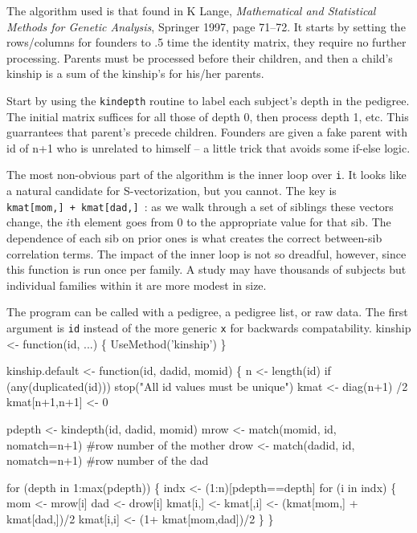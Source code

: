 \documentclass{article}
\begin{document}
The algorithm used is that found in K Lange, 
\emph{Mathematical and Statistical  Methods for Genetic Analysis}, 
Springer 1997, page 71--72.
It starts by setting the rows/columns for founders to .5 time the identity
matrix, they require no further processing.  
Parents must be processed before their children, and then a child's        %
kinship is a sum of the kinship's for his/her parents.                     %

Start by using the {\tt{}kindepth} routine to label each subject's depth in   %
the pedigree.  
The initial matrix suffices for all those of depth 0, then process
depth 1, etc.
This guarrantees that parent's precede children.                            %
Founders are given a fake parent with id of n+1 who is unrelated to 
himself -- a little trick that avoids some if-else logic.

The most non-obvious part of the algorithm is the inner loop over {\tt{}i}.
It looks like a natural candidate for S-vectorization, but you cannot.
The key is {\tt{}kmat[mom,]\ +\ kmat[dad,]\ }: as we walk through a set of
siblings these vectors change, the $i$th element goes from 0 to the
appropriate value for that sib.  The dependence of each sib on prior
ones is what creates the correct between-sib correlation terms. 
The impact of the inner loop is not so dreadful, however, since this
function is run once per family.  A study may have thousands of
subjects but individual families within it are more modest in size.

The program can be called with a pedigree, a pedigree list, or
raw data.  The first argument is {\tt{}id} instead of the more generic {\tt{}x}
for backwards compatability.
\nwenddocs{}\endmoddef
kinship <- function(id, ...) \{
    UseMethod('kinship')
    \}

kinship.default <- function(id, dadid, momid) \{
    n <- length(id)
    if (any(duplicated(id))) stop("All id values must be unique")
    kmat <- diag(n+1) /2
    kmat[n+1,n+1]    <- 0 

    pdepth <- kindepth(id, dadid, momid)
    mrow <- match(momid, id, nomatch=n+1) #row number of the mother
    drow <- match(dadid, id, nomatch=n+1) #row number of the dad 

    for (depth in 1:max(pdepth)) \{
        indx <- (1:n)[pdepth==depth]
        for (i in indx) \{
            mom <- mrow[i]
            dad <- drow[i]
            kmat[i,]  <- kmat[,i] <- (kmat[mom,] + kmat[dad,])/2
            kmat[i,i] <- (1+ kmat[mom,dad])/2
            \}
        \}
    
\end{document}
